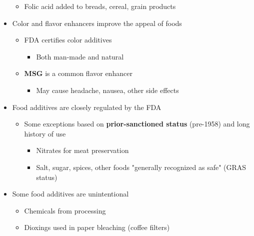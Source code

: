 \documentclass[12pt]{article}
\begin{document}
\begin{itemize}
\begin{itemize}
                        \item Folic acid added to breads, cereal, grain products
                    \end{itemize}
                \item Color and flavor enhancers improve the appeal of foods
                    \begin{itemize}
                        \item FDA certifies color additives
                            \begin{itemize}
                                \item Both man-made and natural
                            \end{itemize}
                        \item \textbf{MSG} is a common flavor enhancer
                            \begin{itemize}
                                \item May cause headache, nausea, other side effects
                            \end{itemize}
                    \end{itemize}
                \item Food additives are closely regulated by the FDA
                    \begin{itemize}
                        \item Some exceptions based on \textbf{prior-sanctioned status} (pre-1958) and long history of use
                            \begin{itemize}
                                \item Nitrates for meat preservation
                                \item Salt, sugar, spices, other foods "generally recognized as safe" (GRAS status)
                            \end{itemize}
                    \end{itemize}
                \item Some food additives are unintentional
                    \begin{itemize}
                        \item Chemicals from processing
                        \item Dioxings used in paper bleaching (coffee filters)
                    \end{itemize}
            \end{itemize}
\end{document}
